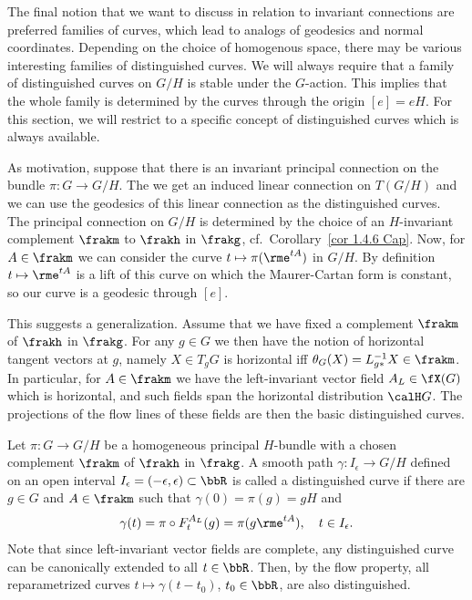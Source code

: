 The final notion that we want to discuss in relation to invariant connections are preferred families of curves, which lead to analogs of geodesics and normal coordinates. Depending on the choice of homogenous space, there may be various interesting families of distinguished curves. We will always require that a family of distinguished curves on $G\slash H$ is stable under the $G$-action. This implies that the whole family is determined by the curves through the origin $[e]=eH$. For this section, we will restrict to a specific concept of distinguished curves which is always available.

As motivation, suppose that there is an invariant principal connection on the bundle $\pi:G\to G\slash H$. The we get an induced linear connection on $T(G\slash H)$ and we can use the geodesics of this linear connection as the distinguished curves. The principal connection on $G\slash H$ is determined by the choice of an $H$-invariant complement $\frakm$ to $\frakh$ in $\frakg$, cf.\ Corollary~\ref{cor 1.4.6 Cap}. Now, for $A\in\frakm$ we can consider the curve $t\mapsto \pi(\rme^{tA})$ in $G\slash H$. By definition $t\mapsto \rme^{tA}$ is a lift of this curve on which the Maurer-Cartan form is constant, so our curve is a geodesic through $[e]$.

This suggests a generalization. Assume that we have fixed a complement $\frakm$ of $\frakh$ in $\frakg$. For any $g\in G$ we then have the notion of horizontal tangent vectors at $g$, namely $X\in T_g G$ is horizontal iff $\theta_G(X)=L_{g\ast}^{-1}X\in\frakm$. In particular, for $A\in\frakm$ we have the left-invariant vector field $A_L\in\fX(G)$ which is horizontal, and such fields span the horizontal distribution $\calH G$. The projections of the flow lines of these fields are then the basic distinguished curves.

\begin{defn}
    Let $\pi:G\to G\slash H$ be a homogeneous principal $H$-bundle with a chosen complement $\frakm$ of $\frakh$ in $\frakg$. A smooth path $\gamma:I_\epsilon\to G\slash H$ defined on an open interval $I_\epsilon=(-\epsilon,\epsilon)\subset \bbR$ is called a distinguished curve if there are $g\in G$ and $A\in\frakm$ such that $\gamma(0)=\pi(g)=gH$ and 
    \[\gamma(t)=\pi\circ F^{A_L}_t(g)=\pi(g\rme^{tA}),\quad t\in I_\epsilon.\]
    Note that since left-invariant vector fields are complete, any distinguished curve can be canonically extended to all $t\in \bbR$. Then, by the flow property, all reparametrized curves $t\mapsto \gamma(t-t_0)$, $t_0\in\bbR$, are also distinguished.
\end{defn}




